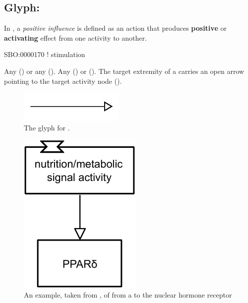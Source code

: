 \subsection{Glyph: }
\label{sec:af:positive_infl}

In \SBGNAFLone, a \emph{positive influence} is defined as an action that produces \textbf{positive} or \textbf{activating} effect from one activity to another.

\begin{glyphDescription}

\glyphSboTerm SBO:0000170 ! stimulation

 \glyphOrigin Any  () or any  ().
 \glyphTarget Any  () or  ().
 \glyphEndPoint The target extremity of a  carries an open arrow pointing to the target activity node ().

\end{glyphDescription}

\begin{figure}[H]
  \centering
  \includegraphics[width = 2in]{images/build/positiveInfluence.pdf}
  \caption{The \AF glyph for .}
  \label{fig:af:positiveInfl}
\end{figure}

\begin{figure}[H]
  \centering
  \includegraphics[scale = 1]{src/images/build/positive_influence_example.pdf}
  \caption{An example, taken from , of  from a  to the nuclear hormone receptor }
  \label{fig:af:exPI}
\end{figure} 
